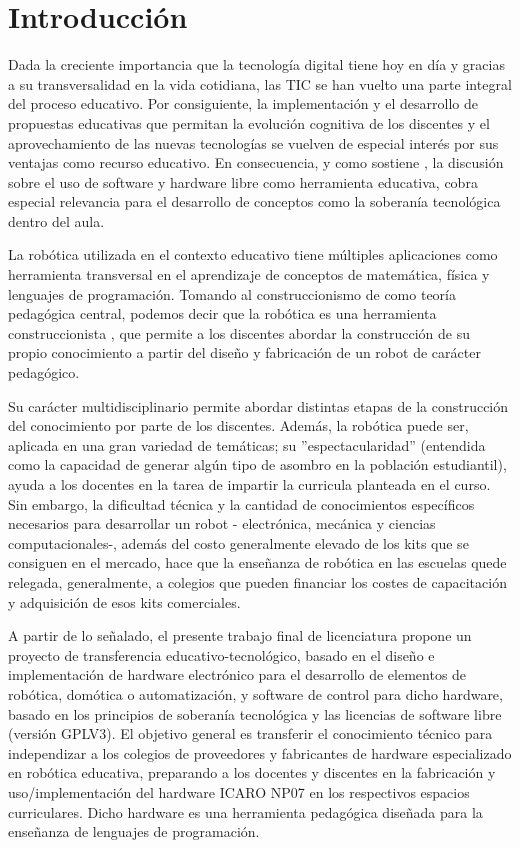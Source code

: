 \section{Introducción}

Dada la creciente importancia que la tecnología digital tiene hoy en día y gracias a su transversalidad en la vida cotidiana, las TIC se han vuelto una parte integral del proceso educativo. Por consiguiente, la implementación y el desarrollo de propuestas educativas que permitan la evolución cognitiva de los discentes y el aprovechamiento de las nuevas tecnologías se vuelven de especial interés por sus ventajas como recurso educativo. En consecuencia, y como sostiene \citet{chavarria_software_2011}, la discusión sobre el uso de software y hardware libre como herramienta educativa, cobra especial relevancia para el desarrollo de conceptos como la soberanía tecnológica dentro del aula.

La robótica utilizada en el  contexto educativo tiene múltiples  aplicaciones como herramienta transversal en el aprendizaje de conceptos de matemática, física y lenguajes de programación. Tomando al construccionismo de \citet{papert_childrens_1993} como teoría pedagógica central, podemos decir que la robótica es una herramienta construccionista \citep{pitti_experiencias_2010}, que permite a los discentes abordar  la construcción de su propio conocimiento a partir del diseño y fabricación de un robot de carácter pedagógico.  

Su carácter multidisciplinario permite abordar distintas etapas de la construcción del conocimiento por parte de los discentes. Además, la robótica puede ser, aplicada en una gran variedad de temáticas; su ''espectacularidad'' (entendida como la capacidad de generar algún tipo de asombro en la población estudiantil), ayuda a los docentes en la tarea de impartir la curricula planteada en el curso. Sin embargo, la dificultad técnica y la cantidad de conocimientos específicos necesarios para desarrollar un robot - electrónica, mecánica y ciencias computacionales-, además del costo generalmente elevado de los kits que se consiguen en el mercado, hace que la enseñanza de robótica en las escuelas quede relegada, generalmente, a colegios que pueden financiar los costes de capacitación y adquisición de esos kits comerciales.

A partir de lo señalado, el presente trabajo final de licenciatura propone un proyecto de transferencia educativo-tecnológico, basado en el diseño e implementación de hardware electrónico para el desarrollo de elementos de robótica, domótica o automatización, y software de control para dicho hardware, basado en los principios de soberanía tecnológica y las licencias de software libre (versión GPLV3). El objetivo general es transferir el conocimiento técnico para independizar a los colegios de proveedores y fabricantes de hardware especializado en robótica educativa, preparando a los docentes y discentes en la fabricación y uso/implementación del hardware ICARO NP07 en los respectivos espacios curriculares. Dicho hardware es una herramienta pedagógica diseñada para la enseñanza de lenguajes de programación. 

